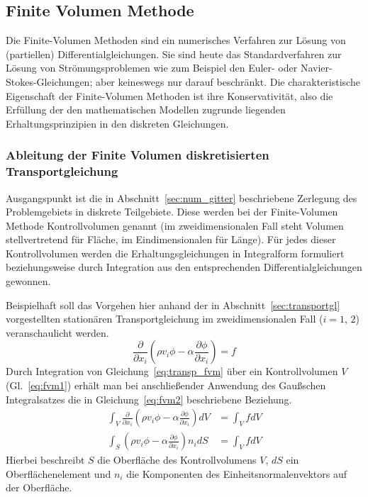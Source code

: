 \subsection{Finite Volumen Methode}

Die Finite-Volumen Methoden sind ein numerisches Verfahren zur Lösung von (partiellen)
Differential\-gleich\-ungen. Sie sind heute das Standardverfahren zur Lösung von Strömungsproblemen
wie zum Beispiel den Euler- oder Navier-Stokes-Gleichungen; aber keineswegs nur darauf beschränkt.
Die charakteristische Eigenschaft der Finite-Volumen Methoden ist ihre Konservativität, also
die Erfüllung der den mathematischen Modellen zugrunde liegenden Erhaltungsprinzipien in den
diskreten Gleichungen.

\subsubsection{Ableitung der Finite Volumen diskretisierten Transportgleichung}

Ausgangspunkt ist die in Abschnitt~\ref{sec:num_gitter} beschriebene Zerlegung des Problemgebiets
in diskrete Teilgebiete. Diese werden bei der Finite-Volumen Methode Kontrollvolumen
genannt (im zweidimensionalen Fall steht Volumen stellvertretend für Fläche,
im Eindimensionalen für Länge).
Für jedes dieser Kontrollvolumen werden die Erhaltungsgleichungen in Integralform formuliert
beziehungsweise durch Integration aus den entsprechenden Differentialgleichungen gewonnen.

Beispielhaft soll das Vorgehen hier anhand der in Abschnitt~\ref{sec:transportgl}
vorgestellten stationären Transportgleichung im zweidimensionalen Fall
($i=1$, $2$) veranschaulicht werden.
\begin{equation}
  \frac{\partial}{\partial x_i} \left({\rho v_i \phi
- \alpha \frac{\partial \phi}{\partial x_i} }\right) = f
\label{eq:transp_fvm}
\end{equation}
Durch Integration von Gleichung~\eqref{eq:transp_fvm} über ein Kontrollvolumen $V$ (Gl.~\ref{eq:fvm1})
erhält man bei anschließender Anwendung des Gaußschen Integralsatzes die in Gleichung~\eqref{eq:fvm2} beschriebene Beziehung.
\begin{align}
  \int_V \frac{\partial}{\partial x_i} \left({\rho v_i \phi
- \alpha \frac{\partial \phi}{\partial x_i} }\right) dV &= \int_V f dV \label{eq:fvm1}\\
  \int_S  \left({\rho v_i \phi
- \alpha \frac{\partial \phi}{\partial x_i} }\right) n_i dS&= \int_V f dV \label{eq:fvm2}
\end{align}
Hierbei beschreibt $S$ die Oberfläche des Kontrollvolumens $V$, $dS$ ein Oberflächenelement
und $n_i$ die Komponenten des Einheitsnormalenvektors auf der Oberfläche.

